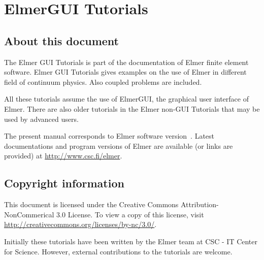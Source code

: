\chapter*{ElmerGUI Tutorials}

\section*{About this document}

The Elmer GUI Tutorials is part of the documentation of 
Elmer finite element software.
Elmer GUI Tutorials gives examples on the use of Elmer in different field
of continuum physics. Also coupled problems are included. 

All these tutorials assume the use of ElmerGUI, the graphical 
user interface of Elmer. There are also older tutorials in the Elmer non-GUI Tutorials that 
may be used by advanced users.

The present manual
corresponds to Elmer software version~\elmerversion{}.
Latest documentations and program versions of Elmer are available (or links are provided) at 
\url{http://www.csc.fi/elmer}. 

\section*{Copyright information}

This document is licensed under the Creative Commons Attribution-NonCommerical 3.0 License. 
To view a copy of this license, visit \url{http://creativecommons.org/licenses/by-nc/3.0/}.

Initially these tutorials have been written by the Elmer team at CSC - IT Center for Science. 
However, external contributions to the tutorials are welcome. 

